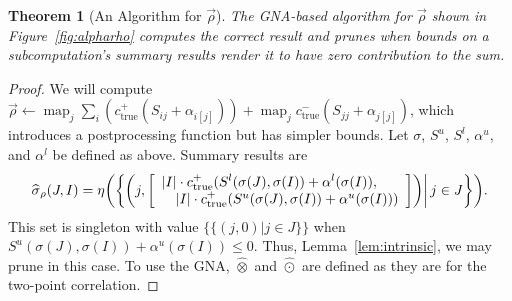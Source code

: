 \documentclass{article}
\newtheorem{theorem}{Theorem}
\newcommand{\killspace}{\vspace{-0.08in}}
\newcommand{\sigmahat}{\mathbin{\widehat{\sigma}}}
\newcommand{\otimeshat}{\mathbin{\widehat{\otimes}}}
\newcommand{\odothat}{\mathbin{\widehat{\odot}}}
\DeclareMathOperator*{\map}{map}
\newcommand{\simhrectmin}{S^{l}}
\newcommand{\simhrectmax}{S^{u}}
\newcommand{\true}{\text{true}}
\newcommand{\ocpos}[1]{c^{+}_{#1}}
\newcommand{\ocneg}[1]{c^{-}_{#1}}
\newcommand{\simil}[2]{S_{#1#2}}
\newcommand{\vecrho}{\vec{\rho}}
\newcommand{\falphaj}[2]{\alpha_{#1[#2]}}
\newcommand{\falphamax}{\alpha^{u}}
\newcommand{\falphamin}{\alpha^{l}}
\begin{document}
\begin{theorem}[An Algorithm for $\vecrho$]
  The GNA-based algorithm for $\vecrho$ shown in
  Figure~\ref{fig:alpharho} computes the correct result and prunes
  when bounds on a subcomputation's summary results render it to have
  zero contribution to the sum.
\end{theorem}
\killspace
\killspace
\begin{proof}
  We will compute $\vecrho \gets \map_j \sum_i (
  \ocpos{\true}(\simil{i}{j} + \falphaj{i}{j}) ) + \map_j
  \ocneg{\true}(\simil{j}{j} + \falphaj{j}{j})$, which introduces a
  postprocessing function but has simpler bounds.  Let $\sigma$,
  $\simhrectmax$, $\simhrectmin$, $\falphamax$, and $\falphamin$ be
  defined as above.  Summary results are
  \killspace
  \[
  \sigmahat_{\rho}(J,I) = \eta \!\left( \left\{ \left.\! \left( j, \left[ \begin{array}{ll}
    \lefteqn{|I| \cdot \ocpos{\true}(\simhrectmin(\sigma(J),\sigma(I)) + \falphamin(\sigma(I)),} \\
    & |I| \cdot \ocpos{\true}(\simhrectmax(\sigma(J),\sigma(I)) + \falphamax(\sigma(I)))
  \end{array} \right] \right) \right| j \in J \right\} \right)\! .
  \]
  This set is singleton with value $\{\{(j,0) | j \in J\}\}$ when
  $\simhrectmax(\sigma(J),\sigma(I)) + \falphamax(\sigma(I)) \leq 0$.
  Thus, Lemma~\ref{lem:intrinsic}, we may prune in this case.  To use
  the GNA, $\otimeshat$ and $\odothat$ are defined as they are for the
  two-point correlation.
\end{proof}
\end{document}
